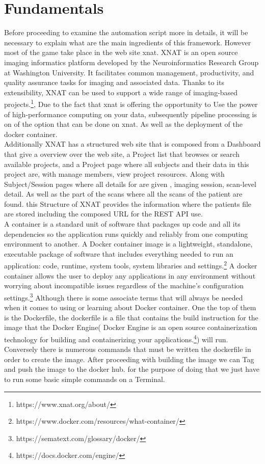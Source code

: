 \chapter{Fundamentals}

Before proceeding to examine the automation script more in details, it will be necessary to explain what are the main ingredients of this framework. However most of the game take place in the web site xnat. 
XNAT is an open source imaging informatics platform developed by the Neuroinformatics Research Group at Washington University. It facilitates common management, productivity, and quality assurance tasks for imaging and associated data. Thanks to its extensibility, XNAT can be used to support a wide range of imaging-based projects.\footnote{https://www.xnat.org/about/}, Due to the fact that xnat is offering the opportunity to Use the power of high-performance computing on your data, subsequently  pipeline processing is on of the option that can be done on xnat. As well as the deployment of the docker container.
\\
Additionally XNAT has a structured web site that is composed from a Dashboard that give a overview over the web site, a Project list that browses or search available projects, and a Project page where all subjects and their data in this project are, with  manage members, view project resources. Along with Subject/Session pages where all details for are given , imaging session, scan-level detail.
As well as the part of the scans where all the scans of the patient are found. 
this Structure of XNAT provides the information where the patients file are stored including the composed URL for the REST API use. 
\\
A container is a standard unit of software that packages up code and all its dependencies so the application runs quickly and reliably from one computing environment to another. A Docker container image is a lightweight, standalone, executable package of software that includes everything needed to run an application: code, runtime, system tools, system libraries and settings.\footnote{https://www.docker.com/resources/what-container/}
A docker container allows the user to deploy any applications in any environment without worrying about incompatible issues regardless of the machine’s configuration settings.\footnote{https://sematext.com/glossary/docker/} Although there is some associate terms that will always be needed when it comes to using or learning about Docker container.
One the top of them is the Dockerfile, the dockerfile is a file that contains the build instruction for the image that the Docker Engine( Docker Engine is an open source containerization technology for building and containerizing your applications.\footnote{https://docs.docker.com/engine/}) will run. Conversely there is numerous commands that must be written  the dockerfile in order to create the image. After proceeding with building the image we can Tag and push the image to the docker hub. for the purpose of doing that we just have to run some basic simple commands on a Terminal.\\
